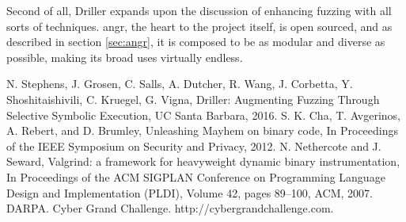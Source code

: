 \documentclass[a4paper]{article}
\begin{document}
Second of all, Driller expands upon the discussion of enhancing fuzzing with all sorts of techniques. angr, the heart to the project itself, is open sourced, and as described in section \ref{sec:angr}, it is composed to be as modular and diverse as possible, making its broad uses virtually endless. 
\newpage
\begin{thebibliography}{9}
	N. Stephens, J. Grosen, C. Salls, A. Dutcher, R. Wang, J. Corbetta, Y. Shoshitaishivili, C. Kruegel, G.  Vigna,
	Driller: Augmenting Fuzzing Through Selective Symbolic Execution,
	UC Santa Barbara,
	2016.
	S. K. Cha, T. Avgerinos, A. Rebert, and D. Brumley,
	Unleashing Mayhem on binary code,
	In Proceedings of the IEEE Symposium on Security and Privacy,
	2012.
	N. Nethercote and J. Seward,
	Valgrind: a framework for heavyweight dynamic binary instrumentation, 
	In Proceedings of the ACM SIGPLAN Conference on Programming Language Design and Implementation (PLDI),
	Volume 42,
	pages 89–100, 
	ACM,
	2007.
	DARPA. Cyber Grand Challenge. http://cybergrandchallenge.com.
\end{thebibliography}
\newpage
\end{document}
